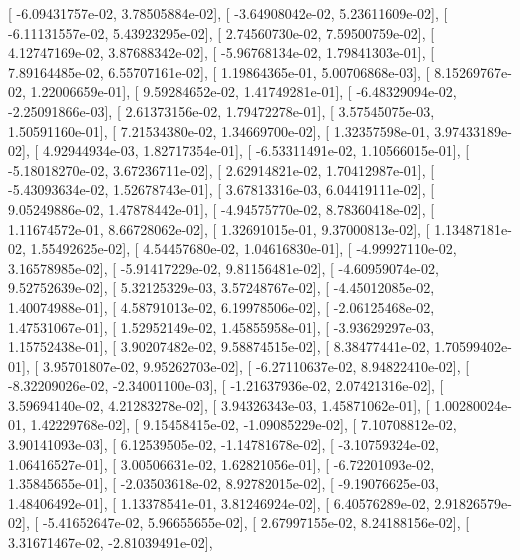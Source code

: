 \documentclass{article}
\begin{document}
       [ -6.09431757e-02,   3.78505884e-02],
       [ -3.64908042e-02,   5.23611609e-02],
       [ -6.11131557e-02,   5.43923295e-02],
       [  2.74560730e-02,   7.59500759e-02],
       [  4.12747169e-02,   3.87688342e-02],
       [ -5.96768134e-02,   1.79841303e-01],
       [  7.89164485e-02,   6.55707161e-02],
       [  1.19864365e-01,   5.00706868e-03],
       [  8.15269767e-02,   1.22006659e-01],
       [  9.59284652e-02,   1.41749281e-01],
       [ -6.48329094e-02,  -2.25091866e-03],
       [  2.61373156e-02,   1.79472278e-01],
       [  3.57545075e-03,   1.50591160e-01],
       [  7.21534380e-02,   1.34669700e-02],
       [  1.32357598e-01,   3.97433189e-02],
       [  4.92944934e-03,   1.82717354e-01],
       [ -6.53311491e-02,   1.10566015e-01],
       [ -5.18018270e-02,   3.67236711e-02],
       [  2.62914821e-02,   1.70412987e-01],
       [ -5.43093634e-02,   1.52678743e-01],
       [  3.67813316e-03,   6.04419111e-02],
       [  9.05249886e-02,   1.47878442e-01],
       [ -4.94575770e-02,   8.78360418e-02],
       [  1.11674572e-01,   8.66728062e-02],
       [  1.32691015e-01,   9.37000813e-02],
       [  1.13487181e-02,   1.55492625e-02],
       [  4.54457680e-02,   1.04616830e-01],
       [ -4.99927110e-02,   3.16578985e-02],
       [ -5.91417229e-02,   9.81156481e-02],
       [ -4.60959074e-02,   9.52752639e-02],
       [  5.32125329e-03,   3.57248767e-02],
       [ -4.45012085e-02,   1.40074988e-01],
       [  4.58791013e-02,   6.19978506e-02],
       [ -2.06125468e-02,   1.47531067e-01],
       [  1.52952149e-02,   1.45855958e-01],
       [ -3.93629297e-03,   1.15752438e-01],
       [  3.90207482e-02,   9.58874515e-02],
       [  8.38477441e-02,   1.70599402e-01],
       [  3.95701807e-02,   9.95262703e-02],
       [ -6.27110637e-02,   8.94822410e-02],
       [ -8.32209026e-02,  -2.34001100e-03],
       [ -1.21637936e-02,   2.07421316e-02],
       [  3.59694140e-02,   4.21283278e-02],
       [  3.94326343e-03,   1.45871062e-01],
       [  1.00280024e-01,   1.42229768e-02],
       [  9.15458415e-02,  -1.09085229e-02],
       [  7.10708812e-02,   3.90141093e-03],
       [  6.12539505e-02,  -1.14781678e-02],
       [ -3.10759324e-02,   1.06416527e-01],
       [  3.00506631e-02,   1.62821056e-01],
       [ -6.72201093e-02,   1.35845655e-01],
       [ -2.03503618e-02,   8.92782015e-02],
       [ -9.19076625e-03,   1.48406492e-01],
       [  1.13378541e-01,   3.81246924e-02],
       [  6.40576289e-02,   2.91826579e-02],
       [ -5.41652647e-02,   5.96655655e-02],
       [  2.67997155e-02,   8.24188156e-02],
       [  3.31671467e-02,  -2.81039491e-02],
\end{document}
